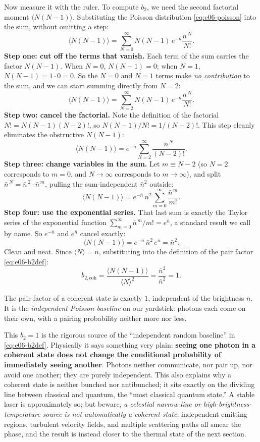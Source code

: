 Now measure it with the ruler. To compute \(b_2\), we need the second factorial moment \(\langle N(N-1)\rangle\). Substituting the Poisson distribution \eqref{eq:e06-poisson} into the sum, without omitting a step:
\[
  \langle N(N-1)\rangle
  =\sum_{N=0}^{\infty}N(N-1)\,e^{-\bar n}\frac{\bar n^{\,N}}{N!}.
\]
\textbf{Step one: cut off the terms that vanish.} Each term of the sum carries the factor \(N(N-1)\). When \(N=0\), \(N(N-1)=0\); when \(N=1\), \(N(N-1)=1\cdot 0=0\). So the \(N=0\) and \(N=1\) terms make \emph{no contribution} to the sum, and we can start summing directly from \(N=2\):
\[
  \langle N(N-1)\rangle
  =\sum_{N=2}^{\infty}N(N-1)\,e^{-\bar n}\frac{\bar n^{\,N}}{N!}.
\]
\textbf{Step two: cancel the factorial.} Note the definition of the factorial \(N!=N(N-1)(N-2)!\), so \(N(N-1)/N!=1/(N-2)!\). This step cleanly eliminates the obstructive \(N(N-1)\):
\[
  \langle N(N-1)\rangle
  =e^{-\bar n}\sum_{N=2}^{\infty}\frac{\bar n^{\,N}}{(N-2)!}.
\]
\textbf{Step three: change variables in the sum.} Let \(m\equiv N-2\) (so \(N=2\) corresponds to \(m=0\), and \(N\to\infty\) corresponds to \(m\to\infty\)), and split \(\bar n^{\,N}=\bar n^{\,2}\cdot\bar n^{\,m}\), pulling the sum-independent \(\bar n^2\) outside:
\[
  \langle N(N-1)\rangle
  =e^{-\bar n}\,\bar n^{2}\sum_{m=0}^{\infty}\frac{\bar n^{\,m}}{m!}.
\]
\textbf{Step four: use the exponential series.} That last sum is exactly the Taylor series of the exponential function \(\sum_{m=0}^{\infty}\bar n^{\,m}/m!=e^{\bar n}\), a standard result we call by name. So \(e^{-\bar n}\) and \(e^{\bar n}\) cancel exactly:
\[
  \langle N(N-1)\rangle
  =e^{-\bar n}\,\bar n^{2}\,e^{\bar n}
  =\bar n^{2}.
\]
Clean and neat. Since \(\langle N\rangle=\bar n\), substituting into the definition of the pair factor \eqref{eq:e06-b2def}:
\begin{equation}
  b_{2,\text{coh}}=\frac{\langle N(N-1)\rangle}{\langle N\rangle^{2}}
  =\frac{\bar n^{2}}{\bar n^{2}}=1.
  \label{eq:e06-coherent-b2}
\end{equation}
\begin{formulaexplain}
The pair factor of a coherent state is exactly \(1\), independent of the brightness \(\bar n\). It is the \emph{independent Poisson baseline} on our yardstick: photons each come on their own, with a pairing probability neither more nor less.
\end{formulaexplain}

This \(b_2=1\) is the rigorous source of the ``independent random baseline'' in \eqref{eq:e06-b2def}. Physically it says something very plain: \textbf{seeing one photon in a coherent state does not change the conditional probability of immediately seeing another}. Photons neither communicate, nor pair up, nor avoid one another; they are purely independent. This also explains why a coherent state is neither bunched nor antibunched; it sits exactly on the dividing line between classical and quantum, the ``most classical quantum state.'' A stable laser is approximately so; but beware, \emph{a celestial narrow-line or high-brightness-temperature source is not automatically a coherent state}: independent emitting regions, turbulent velocity fields, and multiple scattering paths all smear the phase, and the result is instead closer to the thermal state of the next section.

